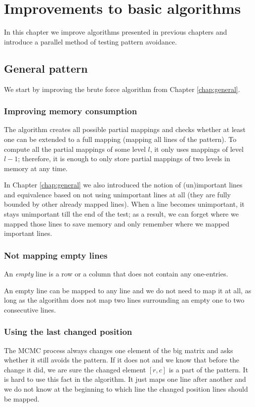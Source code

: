 \chapter{Improvements to basic algorithms}
\label{chap:imp}
In this chapter we improve algorithms presented in previous chapters and introduce a parallel method of testing pattern avoidance.

\section{General pattern}
We start by improving the brute force algorithm from Chapter \ref{chap:general}.

\subsection{Improving memory consumption}
The algorithm creates all possible partial mappings and checks whether at least one can be extended to a full mapping (mapping all lines of the pattern). To compute all the partial mappings of some level $l$, it only uses mappings of level $l-1$; therefore, it is enough to only store partial mappings of two levels in memory at any time.

In Chapter \ref{chap:general} we also introduced the notion of (un)important lines and equivalence based on not using unimportant lines at all (they are fully bounded by other already mapped lines). When a line becomes unimportant, it stays unimportant till the end of the test; as a result, we can forget where we mapped those lines to save memory and only remember where we mapped important lines.

\subsection{Not mapping empty lines}
\begin{defn}
An \emph{empty} line is a row or a column that does not contain any one-entries.
\end{defn}
An empty line can be mapped to any line and we do not need to map it at all, as long as the algorithm does not map two lines surrounding an empty one to two consecutive lines.

\subsection{Using the last changed position}
The MCMC process always changes one element of the big matrix and asks whether it still avoids the pattern. If it does not and we know that before the change it did, we are sure the changed element $[r,c]$ is a part of the pattern. It is hard to use this fact in the algorithm. It just maps one line after another and we do not know at the beginning to which line the changed position lines should be mapped.

